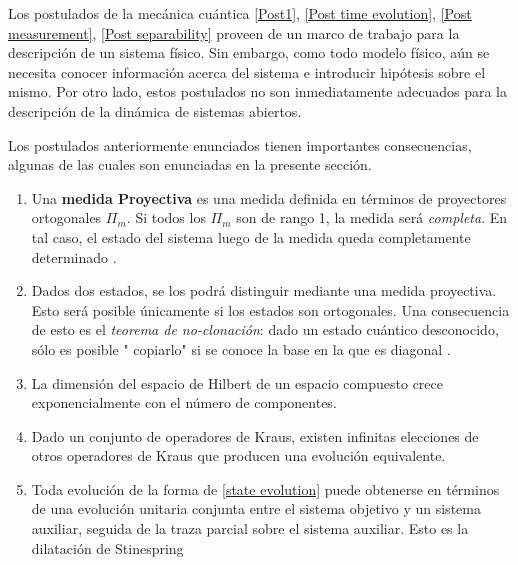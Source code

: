 \begin{Omitir}
Los postulados de la mecánica cuántica \ref{Post1}, \ref{Post time evolution}, \ref{Post measurement}, \ref{Post separability} proveen de un marco de trabajo para la descripción de un sistema físico. Sin embargo, como todo modelo físico, aún se necesita conocer información acerca del sistema e introducir hipótesis sobre el mismo. Por otro lado, estos postulados no son inmediatamente adecuados para la descripción de la dinámica de sistemas abiertos.
\end{Omitir}
\begin{Omitir}
 
 
Los postulados anteriormente enunciados tienen importantes consecuencias, algunas de las cuales son enunciadas en la presente sección. 
  
\begin{enumerate}
 \item  Una \textbf{medida Proyectiva} es una medida definida en términos de proyectores ortogonales $\Pi_{m}$. Si todos los $\Pi_m$ son de rango 1, la medida será \textit{completa}. En tal caso, el estado del sistema luego de la medida queda completamente determinado \cite{Nielsen.00}. 
 
\item Dados dos estados, se los podrá distinguir mediante una medida proyectiva. Esto será posible únicamente si los estados son ortogonales. Una consecuencia de esto es el \textit{teorema de no-clonación}: dado un estado cuántico desconocido, sólo es posible " copiarlo" si se conoce la base en la que es diagonal \cite{Nielsen.00}.
 
\item La dimensión del espacio de Hilbert de un espacio compuesto crece exponencialmente con el número de componentes.
 
\item Dado un conjunto de operadores de Kraus, existen infinitas elecciones de otros operadores de Kraus que producen una evolución equivalente. 
 
\item Toda evolución de la forma de \eqref{state evolution} puede obtenerse en términos de una evolución unitaria conjunta entre el sistema objetivo y un sistema auxiliar, seguida de la traza parcial sobre el sistema auxiliar. Esto es la dilatación de Stinespring \cite{Stinespring,KasparovabtSt.}
\end{enumerate}
\end{Omitir} 

